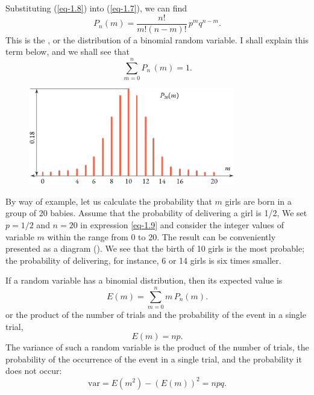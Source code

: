 Substituting (\ref{eq-1.8}) into (\ref{eq-1.7}), we can find
\begin{equation}%
P_{n}(m) = \frac{n!}{m! (n-m)!} \, p^{m}q^{n-m}.
\label{eq-1.9}
\end{equation}
This is the , or the distribution of a binomial
random variable. I shall explain this term below, and we shall see that
\begin{equation}%
\sum_{m=0}^{n}  P_{n}\,(m) = 1.
\label{eq-1.10}
\end{equation}


\begin{figure}[!h]
 \centering
 \includegraphics[width=0.8\textwidth]{figures/binomial-dist.pdf}
 \end{figure}


By way of example, let us calculate the probability that $m$ girls are
born in a group of 20 babies. Assume that the probability of delivering
a girl is 1/2, We set $p= 1/2$ and $n = 20$ in expression \eqref{eq-1.9} and consider the integer values of variable $m$ within the range from 0 to 20. The result can be conveniently presented as a diagram (). We see that the birth of 10 girls is the most probable; the probability of delivering, for instance, 6 or 14 girls is six times smaller.

If a random variable has a binomial distribution, then its expected
value is
\begin{equation*}
E(m) = \sum_{m=0}^{n} m \, P_{n}(m).
\end{equation*}
or the product of the number of trials and the probability of the event
in a single trial,
\begin{equation}%
E(m) = np.
\label{eq-1.11}
\end{equation}
The variance of such a random variable is the product of the number of
trials, the probability of the occurrence of the event in a single trial, and
the probability it does not occur:
\begin{equation}%
\textrm{var} = E(m^{2}) - (E(m))^2 = npq.
\label{eq-1.12}
\end{equation}


